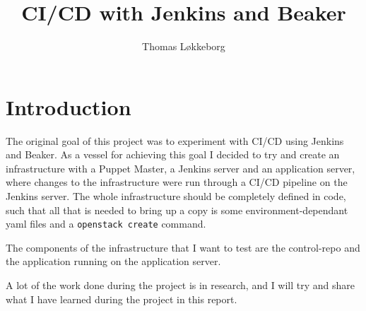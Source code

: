 

\title{CI/CD with Jenkins and Beaker}
\author{Thomas Løkkeborg} %



\maketitle


\thispagestyle{empty}

\clearpage
{}
\setcounter{page}{1}
\tableofcontents

\clearpage
{}

\section{Introduction}

The original goal of this project was to experiment with CI/CD using Jenkins and Beaker. As a vessel for achieving this goal I decided to try and create an infrastructure with a Puppet Master, a Jenkins server and an application server, where changes to the infrastructure were run through a CI/CD pipeline on the Jenkins server. The whole infrastructure should be completely defined in code, such that all that is needed to bring up a copy is some environment-dependant yaml files and a \texttt{openstack create} command.

The components of the infrastructure that I want to test are the control-repo and the application running on the application server.

A lot of the work done during the project is in research, and I will try and share what I have learned during the project in this report. 

